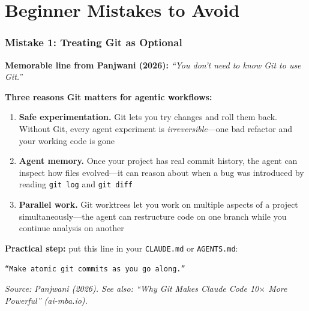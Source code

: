 \documentclass[10pt,english,aspectratio=169]{beamer}
\begin{document}
\section{Beginner Mistakes to Avoid}

\begin{frame}
\frametitle{Mistake 1: Treating Git as Optional}

\textbf{Memorable line from Panjwani (2026):} \textit{``You don't need to know Git to use Git.''}

\vspace{0.3cm}

\textbf{Three reasons Git matters for agentic workflows:}

\begin{enumerate}
    \item \textbf{Safe experimentation.} Git lets you try changes and roll them back. Without Git, every agent experiment is \textit{irreversible}---one bad refactor and your working code is gone
    \vspace{0.1cm}
    \item \textbf{Agent memory.} Once your project has real commit history, the agent can inspect how files evolved---it can reason about when a bug was introduced by reading \texttt{git log} and \texttt{git diff}
    \vspace{0.1cm}
    \item \textbf{Parallel work.} Git worktrees let you work on multiple aspects of a project simultaneously---the agent can restructure code on one branch while you continue analysis on another
\end{enumerate}

\vspace{0.3cm}

\textbf{Practical step:} put this line in your \texttt{CLAUDE.md} or \texttt{AGENTS.md}:

\vspace{0.1cm}

\begin{center}
\texttt{``Make atomic git commits as you go along.''}
\end{center}

\vspace{0.1cm}

\textit{Source: Panjwani (2026). See also: ``Why Git Makes Claude Code 10$\times$ More Powerful'' (ai-mba.io).}
\end{frame}
\end{document}

